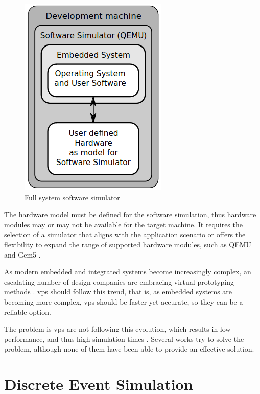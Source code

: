 \begin{figure}[H]
	\centering
 	\includegraphics[width=0.3\linewidth]{Images/FSSsoftware.png}
 	\caption{Full system software simulator \cite{TypesOfFSS}}
	 \label{fig_FSSsoftware}
\end{figure}

The hardware model must be defined for the software simulation, thus hardware modules may or may not be available for the target machine. It 
requires the selection of a simulator that aligns with the application scenario or offers the flexibility to expand the range of supported hardware 
modules, such as QEMU \cite{theQEMUsimulator} and Gem5 \cite{TheGem5Simulator}.

As modern embedded and integrated systems become increasingly complex, an escalating number of design companies are embracing virtual prototyping 
methods \cite{UltraFastVPs}. \Glspl{vp} should follow this trend, that is, as embedded systems are becoming more complex, \glspl{vp} should be 
faster yet accurate, so they can be a reliable option.

The problem is \glspl{vp} are not following this evolution, which results in low performance, and thus high simulation times \cite{pargem5} 
\cite{UltraFastVPs} \cite{optimizingTD}. Several works try to solve the problem, although none of them have been able to 
provide an effective solution.

 

\section{Discrete Event Simulation}




